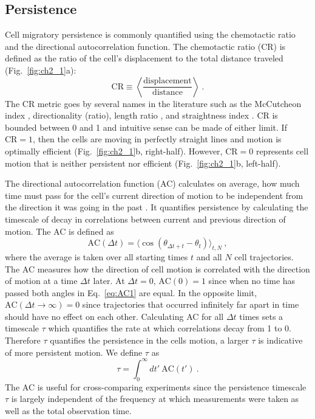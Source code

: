 \subsection{Persistence}

Cell migratory persistence is commonly quantified using the chemotactic ratio and the directional autocorrelation function. The chemotactic ratio (CR) is defined as the ratio of the cell's displacement to the total distance traveled (Fig.\ \ref{fig:ch2_1}a):
\begin{equation}
    \text{CR} \equiv  \left\langle \frac{\text{displacement}}{\text{distance}} \right\rangle \ .
\end{equation}
The CR metric goes by several names in the literature such as the McCutcheon index \cite{mccutcheon1946chemotaxis}, directionality (ratio), length ratio \cite{gorelik2014quantitative}, and straightness index \cite{codling2008random}.
CR is bounded between 0 and 1 and intuitive sense can be made of either limit. If $\text{CR} = 1$, then the cells are moving in perfectly straight lines and motion is optimally efficient (Fig.\ \ref{fig:ch2_1}b, right-half). However, $\text{CR} = 0$ represents cell motion that is neither persistent nor efficient (Fig.\ \ref{fig:ch2_1}b, left-half).

The directional autocorrelation function (AC) calculates on average, how much time must pass for the cell's current direction of motion to be independent from the direction it was going in the past \cite{gorelik2014quantitative,dang2013inhibitory}.
It quantifies persistence by calculating the timescale of decay in correlations between current and previous direction of motion.
The AC is defined as
\begin{equation} \label{eq:AC1}
    \text{AC}(\Delta t) = \langle \cos(\theta_{\Delta t + t}-\theta_{t}) \rangle_{t,N} \ ,
\end{equation}
where the average is taken over all starting times $t$ and all $N$ cell trajectories. The AC measures how the direction of cell motion is correlated with the direction of motion at a time $\Delta t$ later.
At $\Delta t = 0$, $\text{AC}(0) = 1$ since when no time has passed both angles in Eq.\ \ref{eq:AC1} are equal. In the opposite limit,
$\text{AC}(\Delta t \to \infty) = 0$ since trajectories that occurred infinitely far apart in time should have no effect on each other. Calculating AC for all $\Delta t$ times sets a timescale $\tau$ which quantifies the rate at which correlations decay from 1 to 0. Therefore $\tau$ quantifies the persistence in the cells motion, a larger $\tau$ is indicative of more persistent motion. We define $\tau$ as
\begin{equation} \label{eq:tau1}
    \tau = \int_0^\infty dt' \ \text{AC}(t') \ .
\end{equation}
The AC is useful for cross-comparing experiments since the persistence timescale $\tau$ is largely independent of the frequency at which measurements were taken as well as the total observation time.

